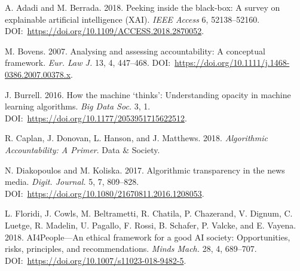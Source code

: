 \begin{thebibliography}{00}

 A. Adadi and M. Berrada. 2018. Peeking inside the black-box: A survey on explainable artificial intelligence (XAI). \textit{IEEE Access} 6, 52138--52160. DOI:~\href{https://doi.org/10.1109/ACCESS.2018.2870052}{https://{\allowbreak}doi.{\allowbreak}org/{\allowbreak}10.{\allowbreak}1109/{\allowbreak}ACCESS.{\allowbreak}2018.{\allowbreak}2870052}.

 M. Bovens. 2007. Analysing and assessing accountability: A conceptual framework. \textit{Eur. Law J.} 13, 4, 447--468. DOI:~\href{https://doi.org/10.1111/j.1468-0386.2007.00378.x}{https://{\allowbreak}doi.{\allowbreak}org/{\allowbreak}10.{\allowbreak}1111/{\allowbreak}j.{\allowbreak}1468-{\allowbreak}0386.{\allowbreak}2007.{\allowbreak}00378.x}.

 J. Burrell. 2016. How the machine `thinks': Understanding opacity in machine learning algorithms. \textit{Big Data Soc.} 3, 1. DOI:~\href{https://doi.org/10.1177/2053951715622512}{https://{\allowbreak}doi.{\allowbreak}org/{\allowbreak}10.{\allowbreak}1177/{\allowbreak}2053951715622512}.

 R. Caplan, J. Donovan, L. Hanson, and J. Matthews. 2018. \textit{Algorithmic Accountability: A Primer}. Data \& Society.

 N. Diakopoulos and M. Koliska. 2017. Algorithmic transparency in the news media. \textit{Digit. Journal.} 5, 7, 809--828. DOI:~\href{https://doi.org/10.1080/21670811.2016.1208053}{https://{\allowbreak}doi.{\allowbreak}org/{\allowbreak}10.{\allowbreak}1080/{\allowbreak}21670811.{\allowbreak}2016.{\allowbreak}1208053}.


 L. Floridi, J. Cowls, M. Beltrametti, R. Chatila, P. Chazerand, V. Dignum, C. Luetge, R. Madelin, U. Pagallo, F. Rossi, B. Schafer, P. Valcke, and E. Vayena. 2018. AI4People---An ethical framework for a good AI society: Opportunities, risks, principles, and recommendations. \textit{Minds Mach.} 28, 4, 689--707. DOI:~\href{https://doi.org/10.1007/s11023-018-9482-5}{https://{\allowbreak}doi.{\allowbreak}org/{\allowbreak}10.{\allowbreak}1007/{\allowbreak}s11023-{\allowbreak}018-{\allowbreak}9482-5}.


\end{thebibliography}
